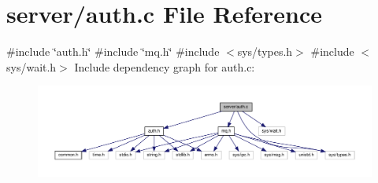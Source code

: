 \section{server/auth.c File Reference}
\label{auth_8c}
{\ttfamily \#include \char`\"{}auth.\+h\char`\"{}}\newline
{\ttfamily \#include \char`\"{}mq.\+h\char`\"{}}\newline
{\ttfamily \#include $<$sys/types.\+h$>$}\newline
{\ttfamily \#include $<$sys/wait.\+h$>$}\newline
Include dependency graph for auth.\+c\+:\nopagebreak
\begin{figure}[H]
\begin{center}
\leavevmode
\includegraphics[width=350pt]{auth_8c__incl}
\end{center}
\end{figure}
